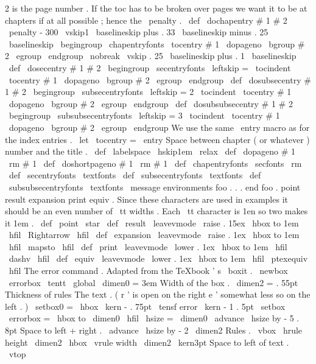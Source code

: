 {2
is
the
%
page
number
.
%
%
If
the
toc
has
to
be
broken
over
pages
we
want
it
to
be
at
chapters
%
if
at
all
possible
;
hence
the
\
penalty
.
\
def
\
dochapentry
#
1
#
2
{
%
\
penalty
-
300
\
vskip1
\
baselineskip
plus
.
33
\
baselineskip
minus
.
25
\
baselineskip
\
begingroup
\
chapentryfonts
\
tocentry
{
#
1
}
{
\
dopageno
\
bgroup
#
2
\
egroup
}
%
\
endgroup
\
nobreak
\
vskip
.
25
\
baselineskip
plus
.
1
\
baselineskip
}
\
def
\
dosecentry
#
1
#
2
{
\
begingroup
\
secentryfonts
\
leftskip
=
\
tocindent
\
tocentry
{
#
1
}
{
\
dopageno
\
bgroup
#
2
\
egroup
}
%
\
endgroup
}
\
def
\
dosubsecentry
#
1
#
2
{
\
begingroup
\
subsecentryfonts
\
leftskip
=
2
\
tocindent
\
tocentry
{
#
1
}
{
\
dopageno
\
bgroup
#
2
\
egroup
}
%
\
endgroup
}
\
def
\
dosubsubsecentry
#
1
#
2
{
\
begingroup
\
subsubsecentryfonts
\
leftskip
=
3
\
tocindent
\
tocentry
{
#
1
}
{
\
dopageno
\
bgroup
#
2
\
egroup
}
%
\
endgroup
}
%
We
use
the
same
\
entry
macro
as
for
the
index
entries
.
\
let
\
tocentry
=
\
entry
%
Space
between
chapter
(
or
whatever
)
number
and
the
title
.
\
def
\
labelspace
{
\
hskip1em
\
relax
}
\
def
\
dopageno
#
1
{
{
\
rm
#
1
}
}
\
def
\
doshortpageno
#
1
{
{
\
rm
#
1
}
}
\
def
\
chapentryfonts
{
\
secfonts
\
rm
}
\
def
\
secentryfonts
{
\
textfonts
}
\
def
\
subsecentryfonts
{
\
textfonts
}
\
def
\
subsubsecentryfonts
{
\
textfonts
}
\
message
{
environments
}
%
foo
.
.
.
end
foo
.
%
point
{
}
result
{
}
expansion
{
}
print
{
}
equiv
{
}
.
%
%
Since
these
characters
are
used
in
examples
it
should
be
an
even
number
of
%
\
tt
widths
.
Each
\
tt
character
is
1en
so
two
makes
it
1em
.
%
\
def
\
point
{
\
star
}
\
def
\
result
{
\
leavevmode
\
raise
.
15ex
\
hbox
to
1em
{
\
hfil
\
Rightarrow
\
hfil
}
}
\
def
\
expansion
{
\
leavevmode
\
raise
.
1ex
\
hbox
to
1em
{
\
hfil
\
mapsto
\
hfil
}
}
\
def
\
print
{
\
leavevmode
\
lower
.
1ex
\
hbox
to
1em
{
\
hfil
\
dashv
\
hfil
}
}
\
def
\
equiv
{
\
leavevmode
\
lower
.
1ex
\
hbox
to
1em
{
\
hfil
\
ptexequiv
\
hfil
}
}
%
The
error
{
}
command
.
%
Adapted
from
the
TeXbook
'
s
\
boxit
.
%
\
newbox
\
errorbox
%
{
\
tentt
\
global
\
dimen0
=
3em
}
%
Width
of
the
box
.
\
dimen2
=
.
55pt
%
Thickness
of
rules
%
The
text
.
(
r
'
is
open
on
the
right
e
'
somewhat
less
so
on
the
left
.
)
\
setbox0
=
\
hbox
{
\
kern
-
.
75pt
\
tensf
error
\
kern
-
1
.
5pt
}
%
\
setbox
\
errorbox
=
\
hbox
to
\
dimen0
{
\
hfil
\
hsize
=
\
dimen0
\
advance
\
hsize
by
-
5
.
8pt
%
Space
to
left
+
right
.
\
advance
\
hsize
by
-
2
\
dimen2
%
Rules
.
\
vbox
{
%
\
hrule
height
\
dimen2
\
hbox
{
\
vrule
width
\
dimen2
\
kern3pt
%
Space
to
left
of
text
.
\
vtop
}}}}
